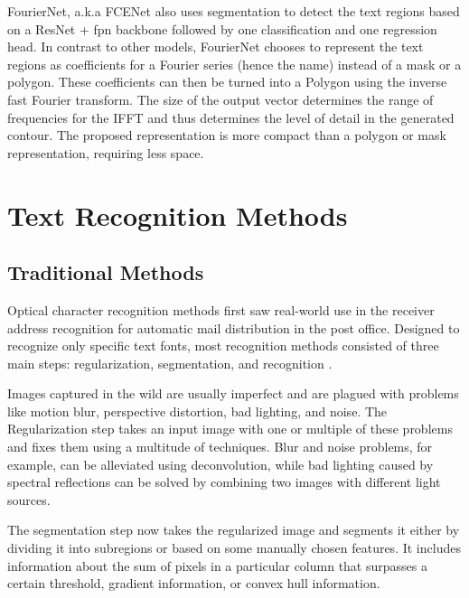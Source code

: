 FourierNet, a.k.a FCENet \cite{riaz_fouriernet_2021} also uses segmentation to detect the text regions based on a ResNet + \gls{fpn} backbone followed by one classification and one regression head. In contrast to other models, FourierNet chooses to represent the text regions as coefficients for a Fourier series (hence the name) instead of a mask or a polygon. These coefficients can then be turned into a Polygon using the inverse fast Fourier transform. The size of the output vector determines the range of frequencies for the IFFT and thus determines the level of detail in the generated contour. The proposed representation is more compact than a polygon or mask representation, requiring less space.

\section{Text Recognition Methods}
\subsection{Traditional Methods}
Optical character recognition methods first saw real-world use in the receiver address recognition for automatic mail distribution in the post office. Designed to recognize only specific text fonts, most recognition methods consisted of three main steps: regularization, segmentation, and recognition \cite{wang_object_2021}.

Images captured in the wild are usually imperfect and are plagued with problems like motion blur, perspective distortion, bad lighting, and noise. The Regularization step takes an input image with one or multiple of these problems and fixes them using a multitude of techniques. Blur and noise problems, for example, can be alleviated using deconvolution, while bad lighting caused by spectral reflections can be solved by combining two images with different light sources.

The segmentation step now takes the regularized image and segments it either by dividing it into subregions or based on some manually chosen features. It includes information about the sum of pixels in a particular column that surpasses a certain threshold, gradient information, or convex hull information.

